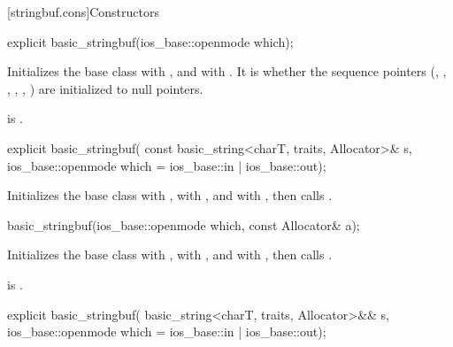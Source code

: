 [stringbuf.cons]{Constructors}

%
\begin{itemdecl}
explicit basic_stringbuf(ios_base::openmode which);
\end{itemdecl}

\begin{itemdescr}
\pnum
\effects
Initializes the base class with
, and
with .
It is
whether the sequence pointers
(, , ,
, , )
are initialized to null pointers.

\pnum
\ensures
{} is .
\end{itemdescr}

%
\begin{itemdecl}
explicit basic_stringbuf(
  const basic_string<charT, traits, Allocator>& s,
  ios_base::openmode which = ios_base::in | ios_base::out);
\end{itemdecl}

\begin{itemdescr}
\pnum
\effects
Initializes the base class with
,
 with , and
 with ,
then calls .
\end{itemdescr}

%
\begin{itemdecl}
basic_stringbuf(ios_base::openmode which, const Allocator& a);
\end{itemdecl}

\begin{itemdescr}
\pnum
\effects
Initializes the base class with
,
 with , and
 with ,
then calls .

\pnum
\ensures
{} is .
\end{itemdescr}

%
\begin{itemdecl}
explicit basic_stringbuf(
  basic_string<charT, traits, Allocator>&& s,
  ios_base::openmode which = ios_base::in | ios_base::out);
\end{itemdecl}


